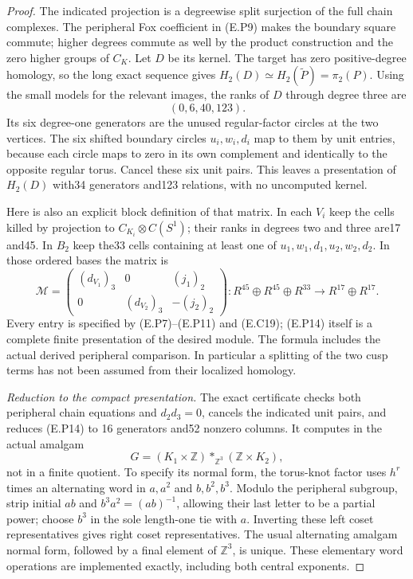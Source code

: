 \begin{proof}
The indicated projection is a degreewise split
surjection of the full chain complexes. The
peripheral Fox coefficient in (E.P9) makes the
boundary square commute; higher degrees commute
as well by the product construction and the
zero higher groups of $C_K$. Let $D$ be its kernel.
The target has zero positive-degree homology, so
the long exact sequence gives
$H_2(D)\simeq H_2(\widetilde P)=\pi_2(P)$.
Using the small models for the relevant images,
the ranks of $D$ through degree three are
\[
                         (0,6,40,123).
 \tag{E.P13}
\]
Its six degree-one generators are the unused
regular-factor circles at the two vertices.
The six shifted boundary circles $u_i,w_i,d_i$
map to them by unit entries, because each circle
maps to zero in its own complement and identically
to the opposite regular torus. Cancel these six
unit pairs. This leaves a presentation of $H_2(D)$
with34 generators and123 relations, with no
uncomputed kernel.

Here is also an explicit block definition of that
matrix. In each $V_i$ keep the cells killed by
projection to $C_{K_i}\otimes C(S^1)$; their ranks
in degrees two and three are17 and45. In $B_2$
keep the33 cells containing at least one of
$u_1,w_1,d_1,u_2,w_2,d_2$. In those ordered bases
the matrix is
\[
 \mathcal M=
 \begin{pmatrix}
 (d_{V_1})_3&0&(j_1)_2\\
 0&(d_{V_2})_3&-(j_2)_2
 \end{pmatrix}:
 R^{45}\oplus R^{45}\oplus R^{33}
             \longrightarrow R^{17}\oplus R^{17}.
 \tag{E.P14}
\]
Every entry is specified by (E.P7)--(E.P11) and
(E.C19); (E.P14) itself is a complete finite
presentation of the desired module. The formula
includes the actual derived peripheral comparison.
In particular a splitting of the two cusp terms
has not been assumed from their localized homology.

\emph{Reduction to the compact presentation.}
The exact certificate
 checks both
peripheral chain equations and $d_2d_3=0$, cancels
the indicated unit pairs, and reduces (E.P14) to
16 generators and52 nonzero columns. It computes
in the actual amalgam
\[
 G=(K_1\times\mathbb Z)\mathop{*}_{\mathbb Z^3}
                                      (\mathbb Z\times K_2),
 \tag{E.P15}
\]
not in a finite quotient. To specify its normal
form, the torus-knot factor uses $h^r$ times an
alternating word in $a,a^2$ and $b,b^2,b^3$.
Modulo the peripheral subgroup, strip initial
$ab$ and $b^3a^2=(ab)^{-1}$, allowing their last
letter to be a partial power; choose $b^3$ in
the sole length-one tie with $a$. Inverting these
left coset representatives gives right coset
representatives. The usual alternating amalgam
normal form, followed by a final element of
$\mathbb Z^3$, is unique. These elementary word
operations are implemented exactly, including
both central exponents.


\end{proof}
